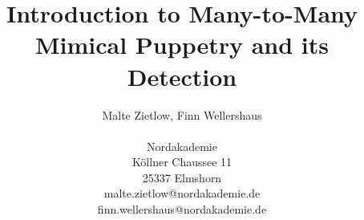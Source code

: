 \documentclass{akdai}
\author{
	Malte Zietlow, Finn Wellershaus \\ 
	\\
	Nordakademie\\ 
	Köllner Chaussee 11\\ 
	25337 Elmshorn \\ 
	malte.zietlow@nordakademie.de \\
	finn.wellershaus@nordakademie.de
}
\theoremstyle{definition}
\begin{document}
\title{Introduction to Many-to-Many Mimical Puppetry and its Detection}
\maketitle

\listoftodos{}            %



% 







{\hypersetup{hidelinks}
    \printbibliography{}
    \printglossaries{}
    \listoffigures
    \listoftables
}

\end{document}
